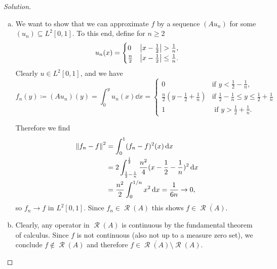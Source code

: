 \documentclass{article}
\theoremstyle{plain}
\theoremstyle{remark}
\newenvironment{solution}{\begin{proof}[Solution]\renewcommand\qedsymbol{}}{\end{proof}}
\newcommand{\Bb}{\mathbb}
\newcommand{\Cal}{\mathcal}
\newcommand{\NN}{\Bb N}
\newcommand\ceq\coloneqq %
\newcommand\clos\overline
\DeclareMathOperator\Ran{\Cal R}
\begin{document}
\begin{solution}
	\begin{enumerate}[(a)]
		\item We want to show that we can approximate $f$ by a sequence $(Au_n)$ for some $(u_n) \subseteq L^2[0,1]$. To this end, define for $n \geq 2$
		\[
		u_n(x) =
		\begin{cases}
			0 &\abs{x - \frac12} > \frac1n, \\
			\frac n2 &\abs{x - \frac12} \leq \frac1n. 
		\end{cases}
		\]
		Clearly $u \in L^2[0, 1]$, and we have
		\[
		f_n(y) \ceq (Au_n)(y) = \int_0^y u_n(x) \dd{x} = \begin{cases}
			0 &\text{if $y < \frac12 - \frac1n$,}\\
			\frac n2(y - \frac12 + \frac1n) &\text{if $\frac12 - \frac1n \leq y \leq \frac12 + \frac1n$} \\
			1 &\text{ if $y > \frac12 + \frac1n$}. 
		\end{cases}
		\]
		
		Therefore we find
		\begin{align*}
			\norm{f_n - f}^2 &= \int_0^1 (f_n - f)^2(x) \dd{x} \\
			&= 2 \int_{\frac12 - \frac1n}^{\frac12} \frac{n^2}{4} (x - \frac12 - \frac1n)^2 \dd{x} \\
			&= \frac{n^2}{2} \int_0^{1/n}  x^2 \dd{x} = \frac{1}{6n} \to 0, 
		\end{align*}
	so $f_n \to f$ in $L^2[0, 1]$. Since $f_n \in \Ran(A)$ this shows $f \in \clos{\Ran(A)}$. 
	
	\item Clearly, any operator in $\Ran(A)$ is continuous by the fundamental theorem of calculus. Since $f$ is not continuous (also not up to a measure zero set), we conclude $f \notin \Ran(A)$ and therefore $f \in \clos{\Ran(A)} \setminus \Ran(A)$.
	
	\end{enumerate}
\end{solution}
\end{document}
